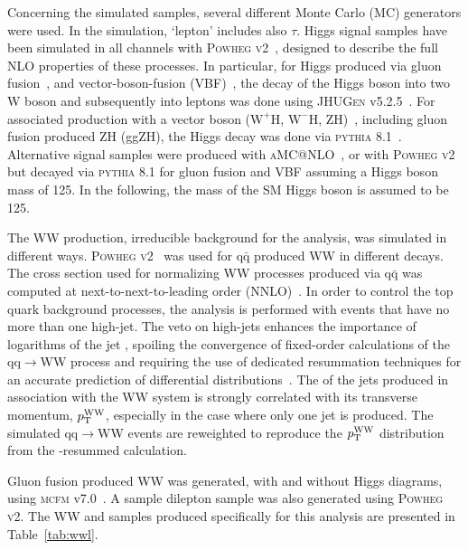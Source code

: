 Concerning the simulated samples, several different Monte Carlo (MC) generators were used. 
In the simulation, `lepton' includes also $\tau$.
Higgs signal samples have been simulated in all channels with
\textsc{Powheg v2}~\cite{Nason:2004rx,Frixione:2007vw,Alioli:2010xd}, designed to describe the full NLO properties of these processes.
In particular, for Higgs produced via gluon fusion~\cite{Alioli:2008tz}, and vector-boson-fusion (VBF)~\cite{Nason:2009ai},
the decay of the Higgs boson into two W boson and subsequently into leptons was done using \textsc{JHUGen} v5.2.5~\cite{JHUGen}. 
For associated production with a vector boson ($\mathrm{W}^{+}\mathrm{H}$, $\mathrm{W}^{-}\mathrm{H}$, ZH)~\cite{Luisoni:2013kna}, including gluon fusion produced ZH (ggZH), 
the Higgs decay was done via \textsc{pythia} 8.1~\cite{Sjostrand:2007gs}.  Alternative signal samples were produced with \textsc{aMC@NLO}~\cite{Alwall:2014hca}, or  with \textsc{Powheg v2} but decayed via \textsc{pythia} 8.1 for gluon fusion and VBF assuming 
a Higgs boson mass of 125\GeV. In the following, the mass of the SM Higgs boson is assumed to be 125\GeV.

The WW production, irreducible background for the analysis, was simulated in different ways. 
\textsc{Powheg v2}~\cite{Melia:2011tj} was used for $\mathrm{q\bar q}$ produced WW in different decays. 
The cross section used for normalizing WW processes produced via $\mathrm{q\bar q}$ was computed at next-to-next-to-leading order (NNLO)~\cite{Gehrmann:2014fva}. 
In order to control the top quark background processes, the analysis is performed with events that have no more than one 
high-\pt jet. The veto on high-\pt jets enhances the importance of logarithms of the jet \pt, spoiling the convergence of 
fixed-order calculations of the qq$\rightarrow$WW process and requiring the use of dedicated resummation techniques for an
accurate prediction of differential distributions~\cite{Meade:2014fca,Jaiswal:2014yba}. 
The \pt of the jets produced in association with the WW system is strongly correlated with its transverse momentum, 
$p_\mathrm{T}^\mathrm{WW}$, especially in the case where only one jet is produced. The simulated qq$\rightarrow$WW events are reweighted  
to reproduce the $p_\mathrm{T}^\mathrm{WW}$ distribution from the \pt-resummed calculation.

Gluon fusion produced WW was generated, with and without Higgs diagrams, using \textsc{mcfm} v7.0~\cite{Campbell:2013wga}. 
A \ttbar sample dilepton sample was also generated using \textsc{Powheg v2}. The WW and \ttbar samples 
produced specifically for this analysis are presented in Table~\ref{tab:wwl}.

